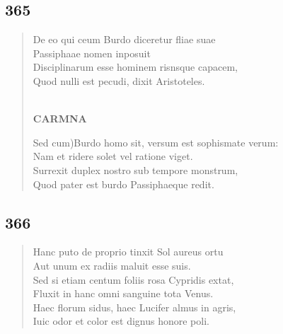 \documentclass[11pt, a4paper]{report}
\begin{document}
            \subsection*{365}
      \begin{verse}
      De eo qui ceum Burdo diceretur fliae suae \\ Passiphaae nomen inposuit \\ Disciplinarum esse hominem risnsque capacem, \\ Quod nulli est pecudi, dixit Aristoteles. \\ 
        ﻿\pagebreak 
    \begin{center} \textbf{CARMNA} \end{center} \marginpar{[284]} Sed  \lbrack cum)Burdo homo sit, versum est sophismate verum: \\ Nam et ridere solet vel ratione viget. \\ Surrexit duplex nostro sub tempore monstrum, \\ Quod pater est burdo Passiphaeque redit. \\ 
      \end{verse}
  
            \subsection*{366}
      \begin{verse}
      Hanc puto de proprio tinxit Sol aureus ortu \\ Aut unum ex radiis maluit esse suis. \\ Sed si etiam centum foliis rosa Cypridis extat, \\ Fluxit in hanc omni sanguine tota Venus. \\ Haec florum sidus, haec Lucifer almus in agris, \\ Iuic odor et color est dignus honore poli. \\ 
      \end{verse}
  
\end{document}
